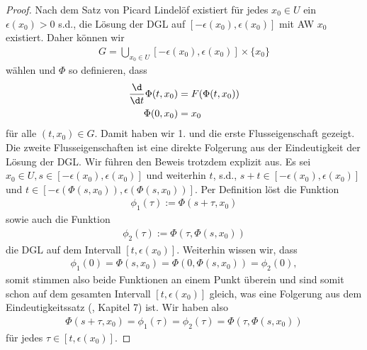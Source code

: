 \documentclass[letterpaper,10pt,english]{jupyterBook}
\begin{document}
\begin{proof}
 Nach dem Satz von Picard Lindelöf existiert für jedes \(x_0\in U\) ein \(\epsilon(x_0)>0\) s.d., die Lösung der DGL
auf \([-\epsilon(x_0),\epsilon(x_0)]\) mit AW \(x_0\) existiert. Daher können wir
\begin{align*}
G = \bigcup_{x_0\in U} [-\epsilon(x_0),\epsilon(x_0)] \times\{x_0\}
\end{align*}
wählen und \(\Phi\) so definieren, dass
\begin{align*}
\frac{\d}{\d t} \Phi(t, x_0) &= F(\Phi(t, x_0))\\
\Phi(0, x_0) &= x_0
\end{align*}
für alle \((t, x_0)\in G\). Damit haben wir 1. und die erste Flusseigenschaft gezeigt. Die zweite Flusseigenschaften ist eine direkte Folgerung aus der Eindeutigkeit der Lösung der DGL. Wir führen den Beweis trotzdem explizit aus. Es sei \(x_0\in U, s\in [-\epsilon(x_0), \epsilon(x_0)]\) und weiterhin \(t\), s.d., \(s+t \in [-\epsilon(x_0), \epsilon(x_0)]\) und \(t\in [-\epsilon(\Phi(s,x_0)), \epsilon(\Phi(s,x_0))]\).
Per Definition löst die Funktion
\begin{align*}
\phi_1(\tau) := \Phi(s + \tau, x_0)
\end{align*}
sowie auch die Funktion
\begin{align*}
\phi_2(\tau) := \Phi(\tau, \Phi(s,x_0))
\end{align*}
die DGL auf dem Intervall \([t, \epsilon(x_0)]\). Weiterhin wissen wir, dass
\begin{align*}
\phi_1(0) = \Phi(s, x_0) = \Phi(0, \Phi(s, x_0)) = \phi_2(0),
\end{align*}
somit stimmen also beide Funktionen an einem Punkt überein und sind somit schon auf dem gesamten Intervall \([t, \epsilon(x_0)]\) gleich, was
eine Folgerung aus dem Eindeutigkeitssatz (\cite{Ten21}, Kapitel 7) ist. Wir haben also
\begin{align*}
\Phi(s + \tau, x_0) = \phi_1(\tau) = \phi_2(\tau) = \Phi(\tau, \Phi(s,x_0))
\end{align*}
für jedes \(\tau\in [t, \epsilon(x_0)]\).
\end{proof}
\end{document}
